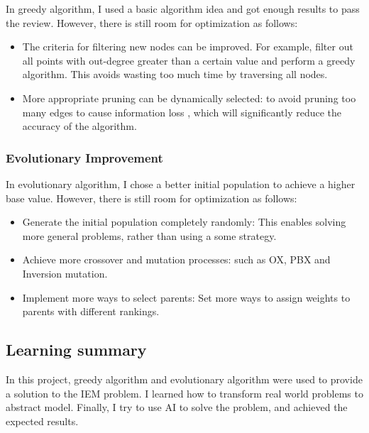 \documentclass{article}
\begin{document}
In greedy algorithm, I used a basic algorithm idea and got enough results to pass the review. However, there is still room for optimization as follows:

\begin{itemize}
    \item The criteria for filtering new nodes can be improved. For example, filter out all points with out-degree greater than a certain value and perform a greedy algorithm. This avoids wasting too much time by traversing all nodes.
    \item More appropriate pruning can be dynamically selected: to avoid pruning too many edges to cause information loss , which will significantly reduce the accuracy of the algorithm.
\end{itemize}

\subsubsection{Evolutionary Improvement}

In evolutionary algorithm, I chose a better initial population to achieve a higher base value. However, there is still room for optimization as follows:

\begin{itemize}
    \item Generate the initial population completely randomly: This enables solving more general problems, rather than using a some strategy.
    \item Achieve more crossover and mutation processes: such as OX, PBX and Inversion mutation.
    \item Implement more ways to select parents: Set more ways to assign weights to parents with different rankings.
\end{itemize}


\subsection{Learning summary}

In this project, greedy algorithm and evolutionary algorithm were used to provide a solution to the IEM problem. I learned how to transform real world problems to abstract model. Finally, I try to use AI to solve the problem, and achieved the expected results.
\end{document}
